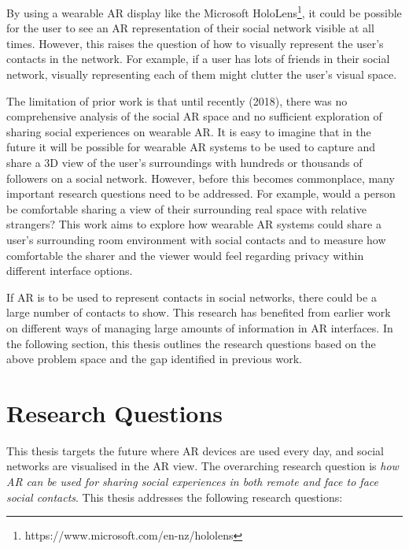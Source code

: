 By using a wearable AR display like the Microsoft HoloLens\footnote{https://www.microsoft.com/en-nz/hololens}, it could be possible for the user to see an AR representation of their social network visible at all times. However, this raises the question of how to visually represent the user's contacts in the network. For example, if a user has lots of friends in their social network, visually representing each of them might clutter the user's visual space.

The limitation of prior work is that until recently (2018), there was no comprehensive analysis of the social AR space and no sufficient exploration of sharing social experiences on wearable AR. It is easy to imagine that in the future it will be possible for wearable AR systems to be used to capture and share a 3D view of the user's surroundings with hundreds or thousands of followers on a social network. However, before this becomes commonplace, many important research questions need to be addressed. For example, would a person be comfortable sharing a view of their surrounding real space with relative strangers? This work aims to explore how wearable AR systems could share a user's surrounding room environment with social contacts and to measure how comfortable the sharer and the viewer would feel regarding privacy within different interface options. 

If AR is to be used to represent contacts in social networks, there could be a large number of contacts to show. This research has benefited from earlier work on different ways of managing large amounts of information in AR interfaces. In the following section, this thesis outlines the research questions based on the above problem space and the gap identified in previous work.

\section{Research Questions}

This thesis targets the future where AR devices are used every day, and social networks are visualised in the AR view. The overarching research question is \textit{how AR can be used for sharing social experiences in both remote and face to face social contacts}. This thesis addresses the following research questions: 

